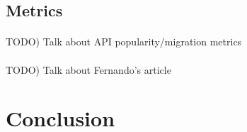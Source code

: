 \documentclass[12pt]{article}
\begin{document}


\subsection{Metrics}
\paragraph{}
TODO) Talk about API popularity/migration metrics


\paragraph{}
TODO) Talk about Fernando's article

\newpage 
\section{Conclusion}


\newpage


\end{document}
